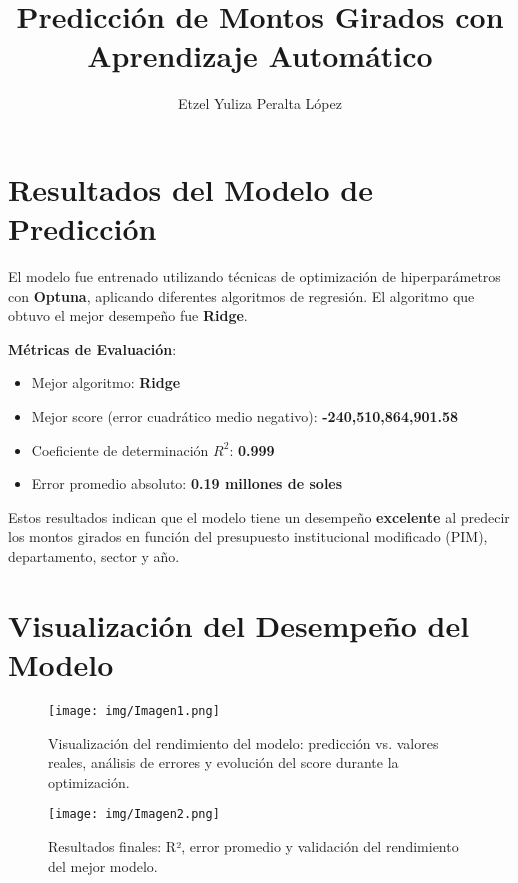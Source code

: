 \documentclass[12pt]{article}
\title{Predicción de Montos Girados con Aprendizaje Automático}
\author{Etzel Yuliza Peralta López}
\date{}
\begin{document}
	
	\maketitle
	
	\section*{Resultados del Modelo de Predicción}
	
	El modelo fue entrenado utilizando técnicas de optimización de hiperparámetros con \textbf{Optuna}, aplicando diferentes algoritmos de regresión. El algoritmo que obtuvo el mejor desempeño fue \textbf{Ridge}.
	
	\vspace{1em}
	\noindent\textbf{Métricas de Evaluación}:
	\begin{itemize}
		\item Mejor algoritmo: \textbf{Ridge}
		\item Mejor score (error cuadrático medio negativo): \textbf{-240,510,864,901.58}
		\item Coeficiente de determinación \( R^2 \): \textbf{0.999}
		\item Error promedio absoluto: \textbf{0.19 millones de soles}
	\end{itemize}
	
	\vspace{1em}
	Estos resultados indican que el modelo tiene un desempeño \textbf{excelente} al predecir los montos girados en función del presupuesto institucional modificado (PIM), departamento, sector y año.
	
	\section*{Visualización del Desempeño del Modelo}
	
	\begin{figure}[H]
		\centering
		\texttt{[image: img/Imagen1.png]}
		\caption{Visualización del rendimiento del modelo: predicción vs. valores reales, análisis de errores y evolución del score durante la optimización.}
	\end{figure}
	
	\vspace{1em}
	
	\begin{figure}[H]
		\centering
		\texttt{[image: img/Imagen2.png]}
		\caption{Resultados finales: R², error promedio y validación del rendimiento del mejor modelo.}
	\end{figure}
	
\end{document}

